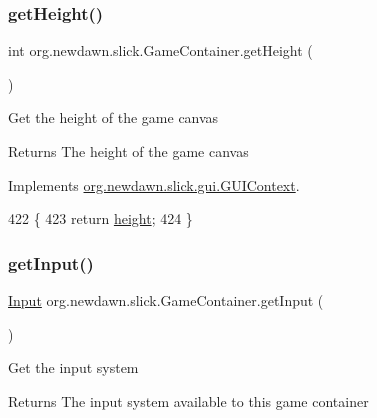 \subsubsection{\texorpdfstring{get\+Height()}{getHeight()}}
{\footnotesize\ttfamily int org.\+newdawn.\+slick.\+Game\+Container.\+get\+Height (\begin{DoxyParamCaption}{ }\end{DoxyParamCaption})\hspace{0.3cm}{\ttfamily [inline]}}

Get the height of the game canvas

\begin{DoxyReturn}{Returns}
The height of the game canvas 
\end{DoxyReturn}


Implements \mbox{\hyperlink{interfaceorg_1_1newdawn_1_1slick_1_1gui_1_1_g_u_i_context_a6370bee8e5833f95e27724b6a533c211}{org.\+newdawn.\+slick.\+gui.\+G\+U\+I\+Context}}.


\begin{DoxyCode}
422                            \{
423         \textcolor{keywordflow}{return} \mbox{\hyperlink{classorg_1_1newdawn_1_1slick_1_1_game_container_aac7312a21bbcaabec14be965c683d970}{height}};
424     \}
\end{DoxyCode}
\mbox{\label{classorg_1_1newdawn_1_1slick_1_1_game_container_a6042fd06c54872f9f791bd33beffec88}} 
\subsubsection{\texorpdfstring{get\+Input()}{getInput()}}
{\footnotesize\ttfamily \mbox{\hyperlink{classorg_1_1newdawn_1_1slick_1_1_input}{Input}} org.\+newdawn.\+slick.\+Game\+Container.\+get\+Input (\begin{DoxyParamCaption}{ }\end{DoxyParamCaption})\hspace{0.3cm}{\ttfamily [inline]}}

Get the input system

\begin{DoxyReturn}{Returns}
The input system available to this game container 
\end{DoxyReturn}


